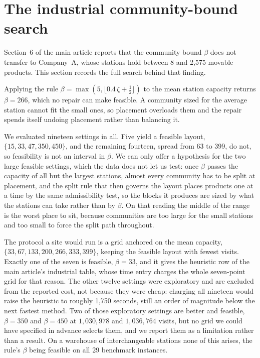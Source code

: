 \documentclass[11pt]{article}
\begin{document}
\section{The industrial community-bound search}\label{sup:betasearch}
Section~6 of the main article reports that the community bound $\beta$ does not transfer to
Company~A, whose stations hold between 8 and 2{,}575 movable products. This section records the
full search behind that finding.

Applying the rule $\beta=\max(5,\lfloor 0.4\,\zeta+\tfrac12\rfloor)$ to the mean station capacity
returns $\beta=266$, which no repair can make feasible. A community sized for the average station
cannot fit the small ones, so placement overloads them and the repair spends itself undoing
placement rather than balancing it.

We evaluated nineteen settings in all. Five yield a feasible layout, $\{15, 33, 47, 350, 450\}$,
and the remaining fourteen, spread from 63 to 399, do not, so feasibility is not an interval in
$\beta$. We can only offer a hypothesis for the two large feasible settings, which the data does
not let us test: once $\beta$ passes the capacity of all but the largest stations, almost every
community has to be split at placement, and the split rule that then governs the layout places
products one at a time by the same admissibility test, so the blocks it produces are sized by what
the stations can take rather than by $\beta$. On that reading the middle of the range is the worst
place to sit, because communities are too large for the small stations and too small to force the
split path throughout.

The protocol a site would run is a grid anchored on the mean capacity, $\{33,67,133,200,266,333,
399\}$, keeping the feasible layout with fewest visits. Exactly one of the seven is feasible,
$\beta=33$, and it gives the heuristic row of the main article's industrial table, whose time entry
charges the whole seven-point grid for that reason. The other twelve settings were exploratory and
are excluded from the reported cost, not because they were cheap: charging all nineteen would raise
the heuristic to roughly 1,750 seconds, still an order of magnitude below the next fastest method.
Two of those exploratory settings are better and feasible, $\beta=350$ and $\beta=450$ at
$1{,}030{,}978$ and $1{,}036{,}764$ visits, but no grid we could have specified in advance selects
them, and we report them as a limitation rather than a result. On a warehouse of interchangeable
stations none of this arises, the rule's $\beta$ being feasible on all 29 benchmark instances.
\end{document}
